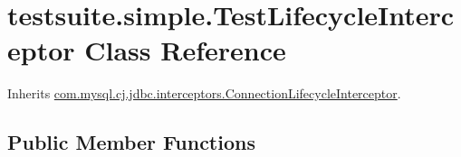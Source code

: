 \hypertarget{classtestsuite_1_1simple_1_1_test_lifecycle_interceptor}{}\section{testsuite.\+simple.\+Test\+Lifecycle\+Interceptor Class Reference}
\label{classtestsuite_1_1simple_1_1_test_lifecycle_interceptor}


Inherits \mbox{\hyperlink{interfacecom_1_1mysql_1_1cj_1_1jdbc_1_1interceptors_1_1_connection_lifecycle_interceptor}{com.\+mysql.\+cj.\+jdbc.\+interceptors.\+Connection\+Lifecycle\+Interceptor}}.

\subsection*{Public Member Functions}
